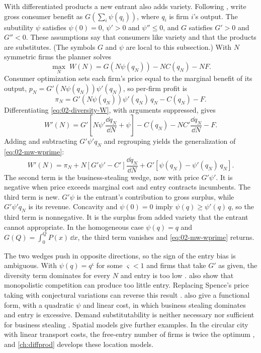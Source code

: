 With differentiated products a new entrant also adds variety. Following \citet{Spence1976},
\citet[pp.~54--55]{MankiwWhinston1986} write gross consumer benefit as $G\left(\sum_i \psi(q_i)\right)$, where
$q_i$ is firm $i$'s output. The subutility $\psi$ satisfies $\psi(0) = 0$, $\psi' > 0$ and $\psi'' \le 0$, and $G$
satisfies $G' > 0$ and $G'' < 0$. These assumptions say that consumers like variety and that the products are
substitutes. (The symbols $G$ and $\psi$ are local to this subsection.) With $N$ symmetric firms the planner solves
\begin{equation}\label{eq:02-diversity-W}
\max_N\; W(N) = G\left(N \psi(q_N)\right) - N C(q_N) - N F .
\end{equation}
Consumer optimization sets each firm's price equal to the marginal benefit of its output,
$p_N = G'\left(N\psi(q_N)\right)\psi'(q_N)$, so per-firm profit is
\begin{equation*}
\pi_N = G'\left(N\psi(q_N)\right)\psi'(q_N)\, q_N - C(q_N) - F .
\end{equation*}
Differentiating \eqref{eq:02-diversity-W}, with arguments suppressed, gives
\begin{equation*}
W'(N) = G'\left[N\psi'\frac{\dd q_N}{\dd N} + \psi\right] - C(q_N) - N C'\frac{\dd q_N}{\dd N} - F .
\end{equation*}
Adding and subtracting $G'\psi' q_N$ and regrouping yields the generalization of \eqref{eq:02-mw-wprime}:
\begin{equation}\label{eq:02-diversity-wprime}
W'(N) = \pi_N + N\left[G'\psi' - C'\right]\frac{\dd q_N}{\dd N} + G'\left[\psi(q_N) - \psi'(q_N)\, q_N\right] .
\end{equation}
The second term is the business-stealing wedge, now with price $G'\psi'$. It is negative when price exceeds marginal
cost and entry contracts incumbents. The third term is new. $G'\psi$ is the entrant's contribution to gross surplus,
while $G'\psi' q_N$ is its revenue. Concavity and $\psi(0) = 0$ imply $\psi(q) \ge \psi'(q)\, q$, so the third term is
nonnegative. It is the surplus from added variety that the entrant cannot appropriate. In the homogeneous case
$\psi(q) = q$ and $G(Q) = \int_0^Q P(x)\,\dd x$, the third term vanishes and \eqref{eq:02-mw-wprime} returns.

The two wedges push in opposite directions, so the sign of the entry bias is ambiguous. With $\psi(q) = q^{\varsigma}$
for some $\varsigma < 1$ and firms that take $G'$ as given, the diversity term dominates for every $N$ and entry is
too low \citep{Spence1976}. \citet{DixitStiglitz1977} also show that monopolistic
competition can produce too little entry. Replacing Spence's price taking with conjectural variations can reverse
this result \citep{KoenkerPerry1981}. \citet[p.~55]{MankiwWhinston1986} also give a functional form, with a quadratic
$\psi$ and linear cost, in which business stealing dominates and entry is excessive. Demand substitutability is
neither necessary nor sufficient for business stealing \citep[n.~14]{MankiwWhinston1986}. Spatial models give further
examples. In the circular city with linear transport costs, the free-entry number of firms is twice the optimum
\citep[sec.~7.1.2]{Tirole1988}, and \cref{ch:diffprod} develops these location models.

